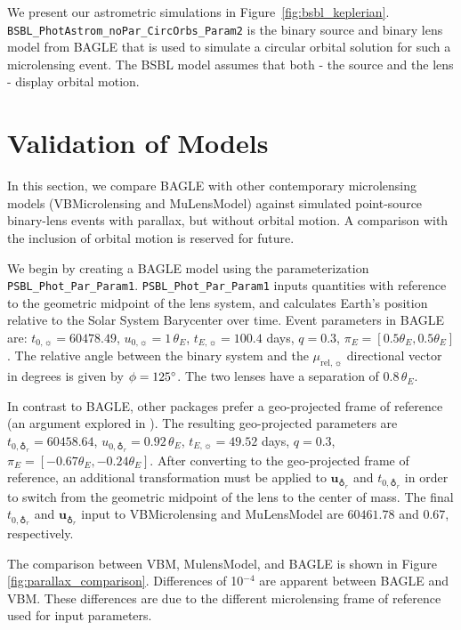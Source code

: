 \documentclass[twocolumn]{aastex701}
\newcommand{\geotr}{\earth_r}
\newcommand{\vect}[1]{\boldsymbol{#1}}
\newcommand{\murel}{\mu_{\mathrm{rel},\sun}}
\newcommand{\tnot}{t_{0,\sun}}
\newcommand{\uvecgeotr}{\vect{u}_{\geotr}}
\newcommand{\tE}{t_{E,\sun}}
\newcommand{\thetaE}{\theta_E}
\newcommand{\uo}{u_{0,\sun}}
\newcommand{\uogeotr}{u_{0,\geotr}}
\newcommand{\piE}{\pi_E}
\newcommand{\tnotgeotr}{t_{0,\geotr}}
\begin{document}
We present our astrometric simulations in Figure~\ref{fig:bsbl_keplerian}. \texttt{BSBL\_PhotAstrom\_noPar\_CircOrbs\_Param2} is the binary source and binary lens model from BAGLE that is used to simulate a circular orbital solution for such a microlensing event. The BSBL model assumes that both - the source and the lens - display orbital motion. 

\section{Validation of Models}
\label{sec:validation}

In this section, we compare BAGLE with other contemporary microlensing models (VBMicrolensing and MuLensModel) against simulated point-source binary-lens events with parallax, but without orbital motion. A comparison with the inclusion of orbital motion is reserved for future. 

We begin by creating a BAGLE model using the parameterization \texttt{PSBL\_Phot\_Par\_Param1}. \texttt{PSBL\_Phot\_Par\_Param1} inputs quantities with reference to the geometric midpoint of the lens system, and calculates Earth's position relative to the Solar System Barycenter over time. Event parameters in BAGLE are: $\tnot = 60478.49$, $\uo=1 \,\thetaE$, $\tE = 100.4$ days, $q = 0.3$, $\piE = [0.5\thetaE, 0.5\thetaE]$. The relative angle between the binary system and the $\murel$ directional vector in degrees is given by $\phi=125 \degree$. The two lenses have a separation of $0.8 \,\thetaE$. 

In contrast to BAGLE, other packages prefer a geo-projected frame of reference (an argument explored in \citet{Lu:2025}). The resulting geo-projected parameters are  $\tnotgeotr = 60458.64$, $\uogeotr= 0.92 \,\thetaE$, $\tE = 49.52$ days, $q = 0.3$, $\piE = [-0.67 \thetaE, -0.24 \thetaE] $. After converting to the geo-projected frame of reference, an additional transformation must be applied to $\uvecgeotr$ and $\tnotgeotr$ in order to switch from the geometric midpoint of the lens to the center of mass. The final $\tnotgeotr$ and $\uvecgeotr$ input to VBMicrolensing and MuLensModel are $60461.78$ and $0.67$, respectively. 

The comparison between VBM, MulensModel, and BAGLE is shown in Figure \ref{fig:parallax_comparison}. Differences of 10$^{-4}$ are apparent between BAGLE and VBM. These differences are due to the different microlensing frame of reference used for input parameters.

\end{document}
